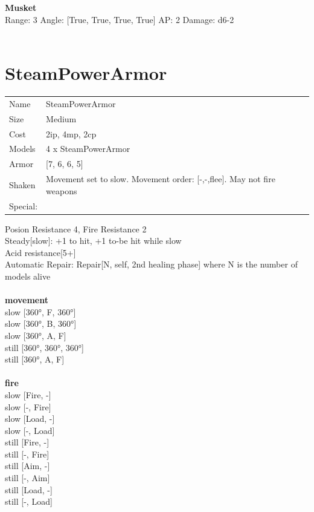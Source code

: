 \ \\

\ \\
{\bf Musket } \\



Range: 3  Angle: [True, True, True, True] AP: 2 Damage: d6-2 \\




 
\ \\













\clearpage

\section{ SteamPowerArmor }

\begin{tabular}{ll}
  Name & SteamPowerArmor \\
  Size & Medium\\
  Cost & 2ip, 4mp, 2cp\\
  Models & 4 x SteamPowerArmor\\
  Armor & [7, 6, 6, 5]\\
  Shaken & Movement set to slow. Movement order: [-,-,flee]. May not fire weapons\\
  Special: \\
\end{tabular}

\noindent Posion Resistance 4, Fire Resistance 2\\ 
Steady[slow]: +1 to hit, +1 to-be hit while slow\\ 
Acid resistance[5+]\\ 
Automatic Repair: Repair[N, self, 2nd healing phase] where N is the number of models alive\\ 


\ \\ {\bf movement } \\
slow [360°, F, 360°] \\
slow [360°, B, 360°] \\
slow [360°, A, F] \\
still [360°, 360°, 360°] \\
still [360°, A, F] \\
\ \\ {\bf fire } \\
slow [Fire, -] \\
slow [-, Fire] \\
slow [Load, -] \\
slow [-, Load] \\
still [Fire, -] \\
still [-, Fire] \\
still [Aim, -] \\
still [-, Aim] \\
still [Load, -] \\
still [-, Load] \\


